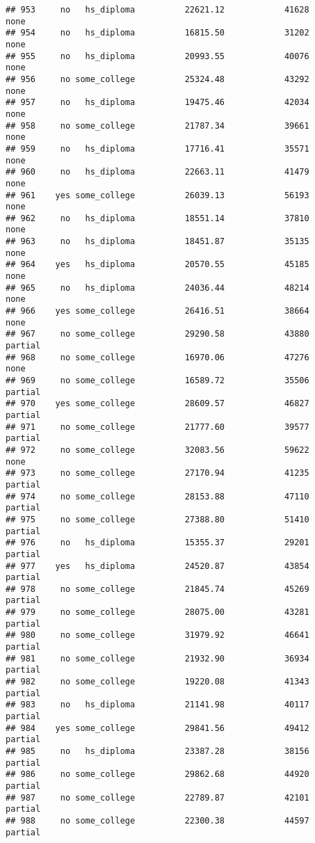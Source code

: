 \documentclass[
]{article}
\begin{document}
\begin{verbatim}
## 953     no   hs_diploma          22621.12            41628        none
## 954     no   hs_diploma          16815.50            31202        none
## 955     no   hs_diploma          20993.55            40076        none
## 956     no some_college          25324.48            43292        none
## 957     no   hs_diploma          19475.46            42034        none
## 958     no some_college          21787.34            39661        none
## 959     no   hs_diploma          17716.41            35571        none
## 960     no   hs_diploma          22663.11            41479        none
## 961    yes some_college          26039.13            56193        none
## 962     no   hs_diploma          18551.14            37810        none
## 963     no   hs_diploma          18451.87            35135        none
## 964    yes   hs_diploma          20570.55            45185        none
## 965     no   hs_diploma          24036.44            48214        none
## 966    yes some_college          26416.51            38664        none
## 967     no some_college          29290.58            43880     partial
## 968     no some_college          16970.06            47276        none
## 969     no some_college          16589.72            35506     partial
## 970    yes some_college          28609.57            46827     partial
## 971     no some_college          21777.60            39577     partial
## 972     no some_college          32083.56            59622        none
## 973     no some_college          27170.94            41235     partial
## 974     no some_college          28153.88            47110     partial
## 975     no some_college          27388.80            51410     partial
## 976     no   hs_diploma          15355.37            29201     partial
## 977    yes   hs_diploma          24520.87            43854     partial
## 978     no some_college          21845.74            45269     partial
## 979     no some_college          28075.00            43281     partial
## 980     no some_college          31979.92            46641     partial
## 981     no some_college          21932.90            36934     partial
## 982     no some_college          19220.08            41343     partial
## 983     no   hs_diploma          21141.98            40117     partial
## 984    yes some_college          29841.56            49412     partial
## 985     no   hs_diploma          23387.28            38156     partial
## 986     no some_college          29862.68            44920     partial
## 987     no some_college          22789.87            42101     partial
## 988     no some_college          22300.38            44597     partial

\end{verbatim}
\end{document}

